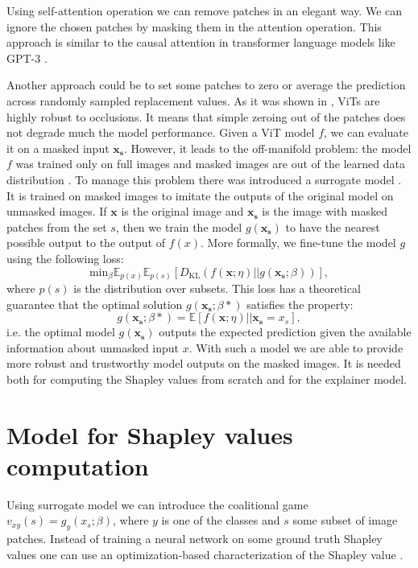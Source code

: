 \documentclass[magisterska,en]{pracamgr}
\begin{document}
Using self-attention operation we can remove patches in an elegant way. We can ignore the chosen patches by masking them in the attention operation. This approach is similar to the causal attention in transformer language models like GPT-3 \cite{DBLP:conf/nips/BrownMRSKDNSSAA20}.

Another approach could be to set some patches to zero or average the prediction across randomly sampled replacement values. As it was shown in \cite{DBLP:conf/nips/NaseerRKHKY21}, ViTs are highly robust to occlusions. It means that simple zeroing out of the patches does not degrade much the model performance.  Given a ViT model $f$, we can evaluate it on a masked input $\mathbf{x_s}$. However, it leads to the off-manifold problem: the model $f$ was trained only on full images and masked images are out of the learned data distribution \cite{DBLP:conf/aistats/TaufiqBM23}.  To manage this problem there was introduced a surrogate model \cite{DBLP:conf/iclr/FryeMBCSF21}. It is trained on masked images to imitate the outputs of the original model on unmasked images. If $\mathbf{x}$ is the original image and $\mathbf{x_s}$ is the image with masked patches from the set $s$, then we train the model $g(\mathbf{x_s})$ to have the nearest possible output to the output of $f(x)$. More formally, we fine-tune the model $g$ using the following loss:
\begin{equation*}
    \textrm{min}_{\beta} \mathbb{E}_{p(x)} \mathbb{E}_{p(s)} \left[D_{\textrm{KL}} \left(f(\mathbf{x};\eta) || g(\mathbf{x_s};\beta)\right)\right],
\end{equation*}
where $p(s)$ is the distribution over subsets. This loss has a theoretical guarantee that the optimal solution $g(\mathbf{x_s};\beta*)$ satisfies the property:
\begin{equation*}
    g(\mathbf{x_s};\beta*) = \mathbb{E}\left[f(\mathbf{x};\eta) || \mathbf{x_s}=x_s \right],
\end{equation*}
i.e. the optimal model $g(\mathbf{x_s})$ outputs the expected prediction given the available information about unmasked input $x$. With such a model we are able to provide more robust and trustworthy model outputs on the masked images. It is needed both for computing the Shapley values from scratch and for the explainer model.

\section{Model for Shapley values computation}\label{s:explainer_model}
Using surrogate model we can introduce the coalitional game $v_{xy}(s) = g_y(x_s;\beta)$, where $y$ is one of the classes and $s$ some subset of image patches. Instead of training a neural network on some ground truth Shapley values one can use an optimization-based characterization of the Shapley value  \cite{Characterization}.
\end{document}
